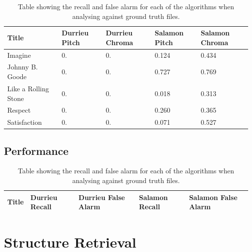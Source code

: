 \begin{table}
\begin{center}
\begin{tabular} {| p{5cm}| p{1.75cm} | p{1.75cm} | p{1.75cm} | p{1.75cm} |} \hline
Title 	& Durrieu Pitch & Durrieu Chroma & Salamon Pitch & Salamon Chroma \\ \hline \hline
Imagine						& 0.			& 0.		& 0.124			& 0.434		\\	\hline
Johnny B. Goode		& 0.			& 0.		& 0.727			& 0.769		\\ 	\hline
Like a Rolling Stone	& 0.			& 0.		& 0.018			& 0.313		\\ 	\hline
Respect						& 0.			& 0.		& 0.260			& 0.365		\\ 	\hline
Satisfaction				& 0.			& 0.		& 0.071			& 0.527		\\	\hline
\end{tabular}
\caption{Table showing the recall and false alarm for each of the algorithms when analysing against ground truth files.}
\label{table:voicedunvoiced}
\end{center}
\end{table}



\subsection{Performance}


\begin{table}
\begin{center}
\begin{tabular} {| p{5cm}| p{1.75cm} | p{1.75cm} | p{1.75cm} | p{1.75cm} |} \hline
Title 	& Durrieu Recall & Durrieu False Alarm 	& Salamon Recall 	& Salamon False Alarm \\ \hline \hline

\end{tabular}
\caption{Table showing the recall and false alarm for each of the algorithms when analysing against ground truth files.}
\label{table:voicedunvoiced}
\end{center}
\end{table}





\vspace{10pt}

\section{Structure Retrieval}

